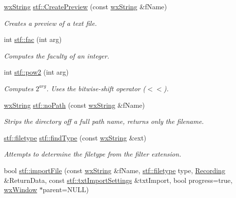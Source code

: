 \begin{DoxyCompactItemize}
\hyperlink{classwxString}{wxString} \hyperlink{group__stfgen_ga32ad0c8e262d2985d84451d3f2c52028}{stf::CreatePreview} (const \hyperlink{classwxString}{wxString} \&fName)
\begin{DoxyCompactList}\small\item\em Creates a preview of a text file. \item\end{DoxyCompactList}\item 
int \hyperlink{group__stfgen_gaf31edaa97d0a41cd830c9478e04fd375}{stf::fac} (int arg)
\begin{DoxyCompactList}\small\item\em Computes the faculty of an integer. \item\end{DoxyCompactList}\item 
int \hyperlink{group__stfgen_gac8474c28c6c1e5cce375823a1d38591d}{stf::pow2} (int arg)
\begin{DoxyCompactList}\small\item\em Computes $ 2^{arg} $. Uses the bitwise-\/shift operator ($<$$<$). \item\end{DoxyCompactList}\item 
\hyperlink{classwxString}{wxString} \hyperlink{group__stfgen_gad14c86e14d611fd5c11eca4edfbb4fb8}{stf::noPath} (const \hyperlink{classwxString}{wxString} \&fName)
\begin{DoxyCompactList}\small\item\em Strips the directory off a full path name, returns only the filename. \item\end{DoxyCompactList}\item 
\hyperlink{group__stfgen_gae703f7802498ae301ac058b94426900f}{stf::filetype} \hyperlink{group__stfgen_ga60f83eec1f06c30440d1f576bd5a5f7e}{stf::findType} (const \hyperlink{classwxString}{wxString} \&ext)
\begin{DoxyCompactList}\small\item\em Attempts to determine the filetype from the filter extension. \item\end{DoxyCompactList}\item 
bool \hyperlink{group__stfgen_ga3c37983f5e22f103c26a77b09d8206ad}{stf::importFile} (const \hyperlink{classwxString}{wxString} \&fName, \hyperlink{group__stfgen_gae703f7802498ae301ac058b94426900f}{stf::filetype} type, \hyperlink{classRecording}{Recording} \&ReturnData, const \hyperlink{structstf_1_1txtImportSettings}{stf::txtImportSettings} \&txtImport, bool progress=true, \hyperlink{classwxWindow}{wxWindow} $\ast$parent=NULL)

\end{DoxyCompactItemize}
